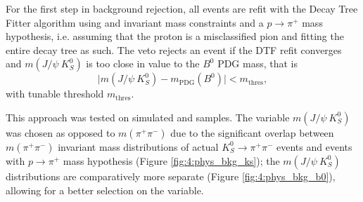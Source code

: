 
For the first step in \bz background rejection, all events are refit with the Decay Tree Fitter algorithm using \jpsi and \kshort invariant mass constraints and a $p \rightarrow \pi^+$ mass hypothesis, i.e. assuming that the proton is a misclassified pion and fitting the entire decay tree as such.
The veto rejects an event if the DTF refit converges and $m(J/\psi~K_S^0)$ is too close in value to the $B^0$ PDG mass, that is
\begin{equation}
	\lvert
	m(J/\psi~K_S^0) - m_\text{PDG}(B^0)
	\rvert < m_\text{thres},
\end{equation}
with tunable threshold $m_\text{thres}$.

This approach was tested on simulated \demonstratorshort and \physbkgshort samples.
The variable $m(J/\psi~K_S^0)$ was chosen as opposed to $m(\pi^+\pi^-)$ due to the significant overlap between $m(\pi^+\pi^-)$ invariant mass distributions of actual $K_S^0 \rightarrow \pi^+ \pi^-$ events and \lambdadecay events with $p\rightarrow \pi^+$ mass hypothesis (Figure \ref{fig:4:phys_bkg_ks});
the $m(J/\psi~K_S^0)$ distributions are comparatively more separate (Figure \ref{fig:4:phys_bkg_b0}), allowing for a better selection on the variable.

